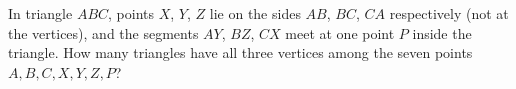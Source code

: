 In triangle $ABC$, points $X$, $Y$, $Z$ lie on the sides $AB$, $BC$, $CA$ respectively (not at the vertices), and the segments $AY$, $BZ$, $CX$ meet at one point $P$ inside the triangle. How many triangles have all three vertices among the seven points $A,B,C,X,Y,Z,P$?
